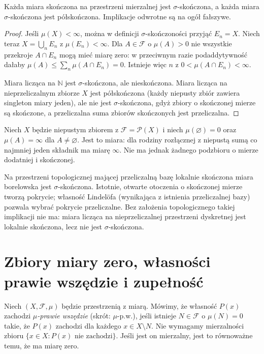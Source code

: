 \begin{twierdzenie}[Implikacje]
\label{thm:finiteness-implications}
Każda miara skończona na przestrzeni mierzalnej jest
$\sigma$-skończona, a każda miara $\sigma$-skończona
jest półskończona. Implikacje odwrotne są na ogół fałszywe.
\end{twierdzenie}
\begin{proof}
Jeśli $\mu(X)<\infty$, można w definicji $\sigma$-skończoności
przyjąć $E_n=X$. Niech teraz $X=\bigcup_nE_n$ z
$\mu(E_n)<\infty$. Dla $A\in\mathcal F$ o $\mu(A)>0$
nie wszystkie przekroje $A\cap E_n$ mogą mieć miarę zero:
w przeciwnym razie podaddytywność dałaby
$\mu(A)\leq\sum_n\mu(A\cap E_n)=0$.
Istnieje więc $n$ z $0<\mu(A\cap E_n)<\infty$.

Miara licząca na $\mathbb N$ jest $\sigma$-skończona,
ale nieskończona. Miara licząca na nieprzeliczalnym
zbiorze $X$ jest półskończona (każdy niepusty zbiór
zawiera singleton miary jeden), ale nie jest
$\sigma$-skończona, gdyż zbiory o skończonej mierze
są skończone, a przeliczalna suma zbiorów skończonych
jest przeliczalna.
\end{proof}

\begin{przyklad}
Niech $X$ będzie niepustym zbiorem z $\mathcal F=\mathcal P(X)$
i niech $\mu(\varnothing)=0$ oraz $\mu(A)=\infty$
dla $A\ne\varnothing$. Jest to miara: dla rodziny
rozłącznej z niepustą sumą co najmniej jeden składnik
ma miarę $\infty$. Nie ma jednak żadnego podzbioru
o mierze dodatniej i skończonej.
\end{przyklad}

\begin{uwaga}
Na przestrzeni topologicznej mającej przeliczalną bazę
lokalnie skończona miara borelowska jest $\sigma$-skończona.
Istotnie, otwarte otoczenia o skończonej mierze tworzą
pokrycie; własność Lindelöfa (wynikająca z istnienia
przeliczalnej bazy) pozwala wybrać pokrycie przeliczalne.
Bez założenia topologicznego takiej implikacji nie ma:
miara licząca na nieprzeliczalnej przestrzeni dyskretnej
jest lokalnie skończona, lecz nie jest $\sigma$-skończona.
\end{uwaga}

\section{Zbiory miary zero, własności prawie wszędzie i zupełność}

\begin{definicja}
\label{def:almost-everywhere}
Niech $(X,\mathcal F,\mu)$ będzie przestrzenią z miarą.
Mówimy, że własność $P(x)$ zachodzi \emph{$\mu$-prawie wszędzie}
(skrót: $\mu$-p.w.), jeśli istnieje $N\in\mathcal F$
o $\mu(N)=0$ takie, że $P(x)$ zachodzi dla każdego
$x\in X\setminus N$. Nie wymagamy mierzalności zbioru
$\{x\in X:P(x)\text{ nie zachodzi}\}$.
Jeśli jest on mierzalny, jest to równoważne temu,
że ma miarę zero.
\end{definicja}

